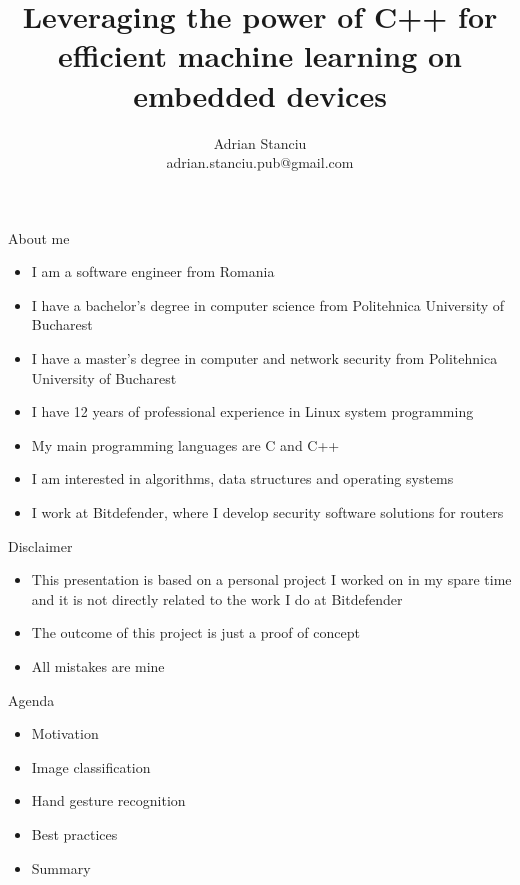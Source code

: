\documentclass{beamer}
\title{Leveraging the power of C++ for efficient machine learning on embedded
devices}
\subtitle{}
\author{Adrian Stanciu\\{\small adrian.stanciu.pub@gmail.com}}
\date{}
\institute{NDC TechTown, 2023}
\begin{document}
\frame{\titlepage}

\begin{frame}{About me}
  \begin{itemize}
	\item I am a software engineer from Romania
	\item I have a bachelor's degree in computer science from Politehnica
	University of Bucharest
	\item I have a master's degree in computer and network security from
	Politehnica University of Bucharest
	\item I have 12 years of professional experience in Linux system
	programming
	\item My main programming languages are C and C++
	\item I am interested in algorithms, data structures and operating systems
	\item I work at Bitdefender, where I develop security software solutions
	for routers
  \end{itemize}
\end{frame}

\begin{frame}{Disclaimer}
  \begin{itemize}
	\item This presentation is based on a personal project I worked on in my
	spare time and it is not directly related to the work I do at Bitdefender
	\item The outcome of this project is just a proof of concept
	\item All mistakes are mine
  \end{itemize}
\end{frame}

\begin{frame}{Agenda}
  \begin{itemize}
	\item Motivation
	\item Image classification
	\item Hand gesture recognition
	\item Best practices
	\item Summary
  \end{itemize}
\end{frame}






\end{document}
